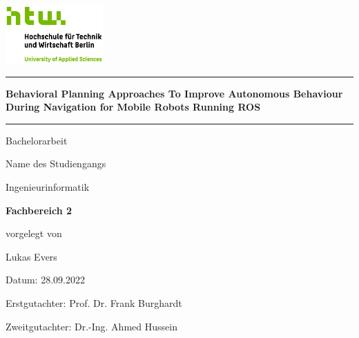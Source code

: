 \begin{titlepage}

\begin{center}
\includegraphics[width=0.28\textwidth,keepaspectratio]{images/HTW_Logo_rgb.jpg}
\end{center}

\bigskip
\bigskip 
\bigskip 
\bigskip 

\par\noindent\rule{\textwidth}{0.4pt}

\bigskip 
\bigskip 
\bigskip 
 
\begin{center}
	\begin{Large}
		\color{htwgreen}
		\textbf{Behavioral Planning Approaches To Improve Autonomous Behaviour During
Navigation for Mobile Robots Running ROS}
	\end{Large}
	
	\bigskip 
	\bigskip 
	\par\noindent\rule{\textwidth}{0.4pt}
	
	\medskip 
	Bachelorarbeit
	\bigskip 
	\bigskip
	\bigskip 
	\bigskip 
	\bigskip 
	\bigskip
	\bigskip 
	\bigskip 

	\bigskip
	Name des Studiengangs\\
	
	\medskip
	\begin{Large}
		Ingenieurinformatik
	\end{Large}
	
	\bigskip 
	\begin{Large}
		\color{htwgreen}
		\textbf{Fachbereich 2}
	\end{Large}

	\bigskip 
	vorgelegt von \\
		
	\begin{Large}
		Lukas Evers\\
		
	\end{Large}
	
	\bigskip 
	\bigskip 
	\bigskip 
	\bigskip 
	\bigskip 
	\bigskip 
	\bigskip 
	\bigskip 
	\bigskip 
	\bigskip 	
	\bigskip 	
	\bigskip 
	\bigskip
	Datum:
	28.09.2022\\
	\bigskip
	
	\begin{Large}
		Erstgutachter: Prof. Dr. Frank Burghardt \\
		
	\end{Large}
	
	\begin{Large}
		Zweitgutachter: Dr.-Ing. Ahmed Hussein \\
		
	\end{Large}


\end{center}

\end{titlepage}